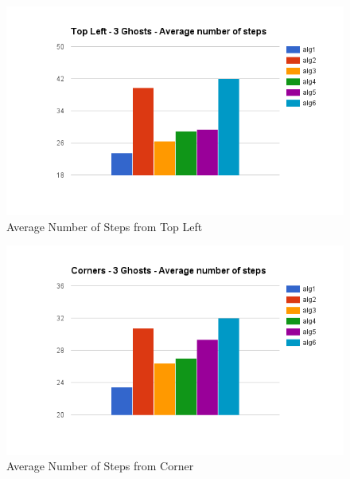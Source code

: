\documentclass[11pt]{article}
\begin{document}
\begin{multicols}{2}
\begin{figure}[H]
	\includegraphics[scale=0.45]{leftsteps.png}
	\caption{Average Number of Steps from Top Left}
	\label{fig:averagenumstepsleft}
\end{figure}

\begin{figure}[H]
	\includegraphics[scale=0.45]{cornersteps.png}
	\caption{Average Number of Steps from Corner}
	\label{fig:averagenumstepscorner}
\end{figure}


\end{multicols}
\end{document}
